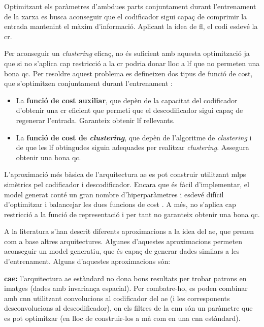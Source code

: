 \documentclass[CAT,BIB]{TFUOC}%
\begin{document}
        Optimitzant els paràmetres d'ambdues parts conjuntament durant l'entrenament de la xarxa es busca aconseguir que el codificador sigui capaç de comprimir la entrada mantenint el màxim d'informació. Aplicant la idea de \gls{fl}, el codi esdevé la \gls{cr}.

        Per aconseguir un \textit{clustering} eficaç, no és suficient amb aquesta optimització ja que si no s'aplica cap restricció a la \gls{cr} podria donar lloc a \gls{lf} que no permeten una bona \gls{qc}. Per resoldre aquest problema es defineixen dos tipus de funció de cost, que s'optimitzen conjuntament durant l'entrenament \citep{Min2018}:
        \begin{itemize}
            \item La \textbf{funció de cost auxiliar}, que depèn de la capacitat del codificador d'obtenir una \gls{cr} eficient que permeti que el descodificador sigui capaç de regenerar l'entrada. Garanteix obtenir \gls{lf} rellevants.
            \item La \textbf{funció de cost de \textit{clustering}}, que depèn de l'algoritme de \textit{clustering} i de que les \gls{lf} obtingudes siguin adequades per realitzar \textit{clustering}. Assegura obtenir una bona \gls{qc}.
        \end{itemize}

        L'aproximació més bàsica de l'arquitectura \gls{ae} es pot construir utilitzant \glspl{mlp} simètrics pel codificador i descodificador. Encara que és fàcil d'implementar, el model generat conté un gran nombre d'hiperparàmetres i esdevé difícil d'optimitzar i balancejar les dues funcions de cost \citep{Karim2021}. A més, no s'aplica cap restricció a la funció de representació i per tant no garanteix obtenir una bona \gls{qc}.

        A la literatura s'han descrit diferents aproximacions a la idea del \gls{ae}, que prenen com a base altres arquitectures. Algunes d'aquestes aproximacions permeten aconseguir un model generatiu, que és capaç de generar dades similars a les d'entrenament. Alguns d'aquestes aproximacions són:

        \textbf{\Gls{cae}:} l'arquitectura \gls{ae} estàndard no dona bons resultats per trobar patrons en imatges (dades amb invariança espacial). Per combatre-ho, es poden combinar amb \gls{cnn} utilitzant convolucions al codificador del \gls{ae} (i les corresponents desconvolucions al descodificador), on els filtres de la \gls{cnn} són un paràmetre que es pot optimitzar (en lloc de construir-los a mà com en una \gls{cnn} estàndard).
\end{document}
